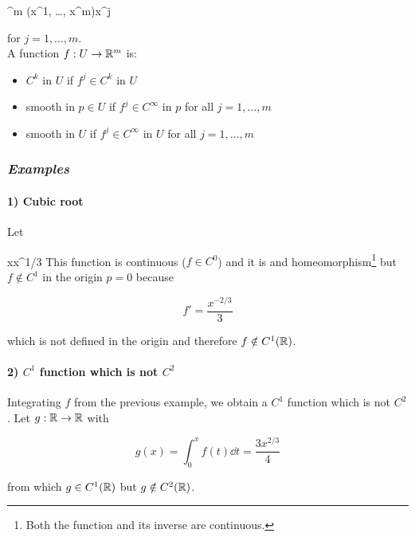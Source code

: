 	{\R^{m}}{\R}
	{(x^{1}, \dots, x^{m})}{x^{j}}

for $ j = 1, \dots, m $. \\
A function $ f : U \to \mathbb{R}^{m} $ is:

\begin{itemize}
	\item $ C^{k} $ in $ U $ if $ f^{j} \in C^{k} $ in $ U $
	
	\item smooth in $ p \in U $ if $ f^{j} \in C^{\infty} $ in $ p $ for all $ j = 1, \dots, m $
	
	\item smooth in $ U $ if $ f^{j} \in C^{\infty} $ in $ U $ for all $ j = 1, \dots, m $
\end{itemize}

\subsubsection{\textit{Examples}}

\paragraph{1) Cubic root}

Let

	{\R}{\R}
	{x}{x^{1/3}}
%	
This function is continuous ($ f \in C^{0} $) and it is and homeomorphism\footnote{%
	Both the function and its inverse are continuous.%
} but $ f \notin C^{1} $ in the origin $ p = 0 $ because

\begin{equation}
	f' = \dfrac{x^{-2/3}}{3}
\end{equation}

which is not defined in the origin and therefore $ f \notin C^{1} (\mathbb{R}) $.

\paragraph{2) $ C^{1} $ function which is not $ C^{2} $}

Integrating $ f $ from the previous example, we obtain a $ C^{1} $ function which is not $ C^{2} $. Let $ g : \mathbb{R} \to \mathbb{R} $ with

\begin{equation}
	g (x) = \int_{0}^{x} f (t) \dd{t} = \dfrac{3 x^{2/3}}{4}
\end{equation}

from which $ g \in C^{1} (\mathbb{R}) $ but $ g \notin C^{2} (\mathbb{R}) $.

